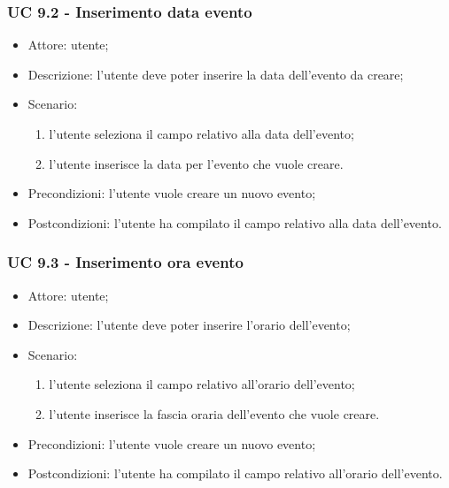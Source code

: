 \subsubsection{UC 9.2 - Inserimento data evento} \label{sec: UC 9.2}
\begin{itemize}
    \item Attore: utente;
    \item Descrizione: l'utente deve poter inserire la data dell'evento da creare;
    \item Scenario:
        \begin{enumerate}
        \item l'utente seleziona il campo relativo alla data dell'evento;
        \item l'utente inserisce la data per l'evento che vuole creare.
        \end{enumerate}
    
    \item Precondizioni: l'utente vuole creare un nuovo evento;
    \item Postcondizioni: l'utente ha compilato il campo relativo alla data dell'evento.
\end{itemize}


\subsubsection{UC 9.3 - Inserimento ora evento} \label{sec: UC 9.3}
\begin{itemize}
    \item Attore: utente;
    \item Descrizione: l'utente deve poter inserire l'orario dell'evento;
    \item Scenario:
        \begin{enumerate}
        \item l'utente seleziona il campo relativo all'orario dell'evento;
        \item l'utente inserisce la fascia oraria dell'evento che vuole creare.
        \end{enumerate}
    
    \item Precondizioni: l'utente vuole creare un nuovo evento;
    \item Postcondizioni: l'utente ha compilato il campo relativo all'orario dell'evento.
\end{itemize}

